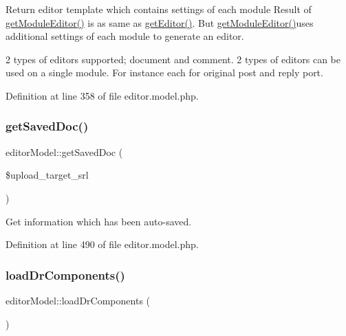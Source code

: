 Return editor template which contains settings of each module Result of \hyperlink{classeditorModel_af2b57078eb05b65c0094d5dac0186ca5}{get\+Module\+Editor()} is as same as \hyperlink{classeditorModel_a77477c0a6d333b3230f77904d96d93c5}{get\+Editor()}. But \hyperlink{classeditorModel_af2b57078eb05b65c0094d5dac0186ca5}{get\+Module\+Editor()}uses additional settings of each module to generate an editor. 

2 types of editors supported; document and comment. 2 types of editors can be used on a single module. For instance each for original post and reply port. 

Definition at line 358 of file editor.\+model.\+php.

\hypertarget{classeditorModel_af9c4c2f7ba2d377b087cac08412b0baa}{}\label{classeditorModel_af9c4c2f7ba2d377b087cac08412b0baa} 
\subsubsection{\texorpdfstring{get\+Saved\+Doc()}{getSavedDoc()}}
{\footnotesize\ttfamily editor\+Model\+::get\+Saved\+Doc (\begin{DoxyParamCaption}\item[{}]{\$upload\+\_\+target\+\_\+srl }\end{DoxyParamCaption})}



Get information which has been auto-\/saved. 



Definition at line 490 of file editor.\+model.\+php.

\hypertarget{classeditorModel_a1ad866d4c1ab454b9d0b72c8d3cc29bd}{}\label{classeditorModel_a1ad866d4c1ab454b9d0b72c8d3cc29bd} 
\subsubsection{\texorpdfstring{load\+Dr\+Components()}{loadDrComponents()}}
{\footnotesize\ttfamily editor\+Model\+::load\+Dr\+Components (\begin{DoxyParamCaption}{ }\end{DoxyParamCaption})}



